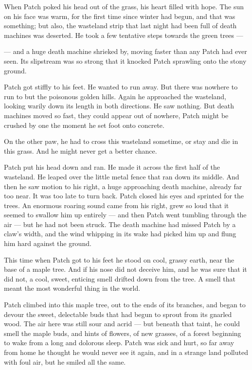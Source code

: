 \documentclass[ebook,oneside,openany,17pt]{memoir}
\begin{document}
When Patch poked his head out of the grass, his heart filled with
hope. The sun on his face was warm, for the first time since winter
had begun, and that was something; but also, the wasteland strip that
last night had been full of death machines was deserted. He took a few
tentative steps towards the green trees —

— and a huge death machine shrieked by, moving faster than any Patch
had ever seen. Its slipstream was so strong that it knocked Patch
sprawling onto the stony ground.

Patch got stiffly to his feet. He wanted to run away. But there was
nowhere to run to but the poisonous golden hills. Again he approached
the wasteland, looking warily down its length in both directions. He
saw nothing. But death machines moved so fast, they could appear out
of nowhere, Patch might be crushed by one the moment he set foot onto
concrete.

On the other paw, he had to cross this wasteland sometime, or stay and
die in this grass. And he might never get a better chance.

Patch put his head down and ran. He made it across the first half of
the wasteland. He leaped over the little metal fence that ran down its
middle. And then he saw motion to his right, a huge approaching death
machine, already far too near. It was too late to turn back. Patch
closed his eyes and sprinted for the trees. An enormous roaring sound
came from his right, grew so loud that it seemed to swallow him up
entirely — and then Patch went tumbling through the air — but he had
not been struck. The death machine had missed Patch by a claw’s width,
and the wind whipping in its wake had picked him up and flung him hard
against the ground.

This time when Patch got to his feet he stood on cool, grassy earth,
near the base of a maple tree. And if his nose did not deceive him,
and he was sure that it did not, a cool, sweet, enticing smell drifted
down from the tree. A smell that meant the most wonderful thing in the
world.

Patch climbed into this maple tree, out to the ends of its branches,
and began to devour the sweet, delectable buds that had begun to
sprout from its gnarled wood. The air here was still sour and acrid —
but beneath that taint, he could smell the maple buds, and hints of
flowers, of new grasses, of a forest beginning to wake from a long and
dolorous sleep. Patch was sick and hurt, so far away from home he
thought he would never see it again, and in a strange land polluted
with foul air, but he smiled all the same.
\end{document}
